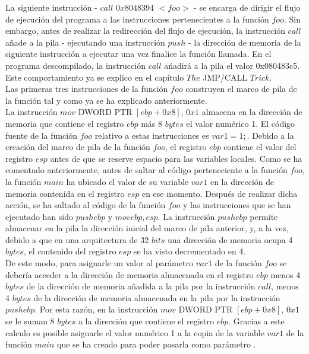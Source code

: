 \documentclass [titlepage, 12pt]{article}
\begin{document}
La siguiente instrucci\'on - $call$ $0x8048394$ $<foo>$ - se encarga de dirigir el flujo de ejecuci\'on del programa a las instrucciones pertenecientes a la funci\'on $foo$. Sin embargo, antes de realizar la redirecci\'on del flujo de ejecuci\'on, la instrucci\'on $call$ a\~nade a la pila - ejecutando una instrucci\'on $push$ - la direcci\'on de memoria de la siguiente instrucci\'on a ejecutar una vez finalice la funci\'on llamada. En el programa descompilado, la instrucci\'on $call$ a\'nadir\'a a la pila el valor 0x080483c5. Este comportamiento ya se explico en el cap\'itulo $The$ JMP/CALL $Trick$. \\

Las primeras tres instrucciones de la funci\'on $foo$ construyen el marco de pila de la funci\'on tal y como ya se ha explicado anteriormente.\\
La instrucci\'on $mov$ DWORD PTR $[ebp+0x8]$, $0x1$ almacena en la direcci\'on de memoria que contiene el registro $ebp$ m\'as 8 $bytes$ el valor num\'erico 1. El c\'odigo fuente de la funci\'on $foo$ relativo a estas instrucciones es $var1 = 1;$. Debido a la creaci\'on del marco de pila de la funci\'on $foo$, el registro $ebp$ contiene el valor del registro $esp$ antes de que se reserve espacio para las variables locales. Como se ha comentado anteriormente, antes de saltar al c\'odigo perteneciente a la funci\'on $foo$, la funci\'on $main$ ha ubicado el valor de su variable $var1$ en la direcci\'on de memoria contenida en el registro $esp$ en ese momento. Despu\'es de realizar dicha acci\'on, se ha saltado al c\'odigo de la funci\'on $foo$ y las instrucciones que se han ejecutado han sido $push ebp$ y $mov ebp, esp$. La instrucci\'on $push ebp$ permite almacenar en la pila la direcci\'on inicial del marco de pila anterior, y, a la vez, debido a que en una arquitectura de 32 $bits$ una direcci\'on de memoria ocupa 4 $bytes$, el contenido del registro $esp$ se ha visto decrementado en 4.\\
De este modo, para asignarle un valor al par\'ametro $var1$ de la funci\'on $foo$ se deber\'ia acceder a la direcci\'on de memoria almacenada en el registro $ebp$ menos 4 $bytes$ de la direcci\'on de memoria a\~nadida a la pila por la instrucci\'on $call$, menos 4 $bytes$ de la direcci\'on de memoria almacenada en la pila por la instrucci\'on $push ebp$. Por esta raz\'on, en la instrucci\'on $mov$ DWORD PTR $[ebp+0x8]$, $0x1$ se le suman 8 $bytes$ a la direcci\'on que contiene el registro $ebp$. Gracias a este calculo es posible asignarle el valor num\'erico 1 a la copia de la variable $var1$ de la funci\'on $main$ que se ha creado para poder pasarla como par\'ametro .\\
\end{document}
